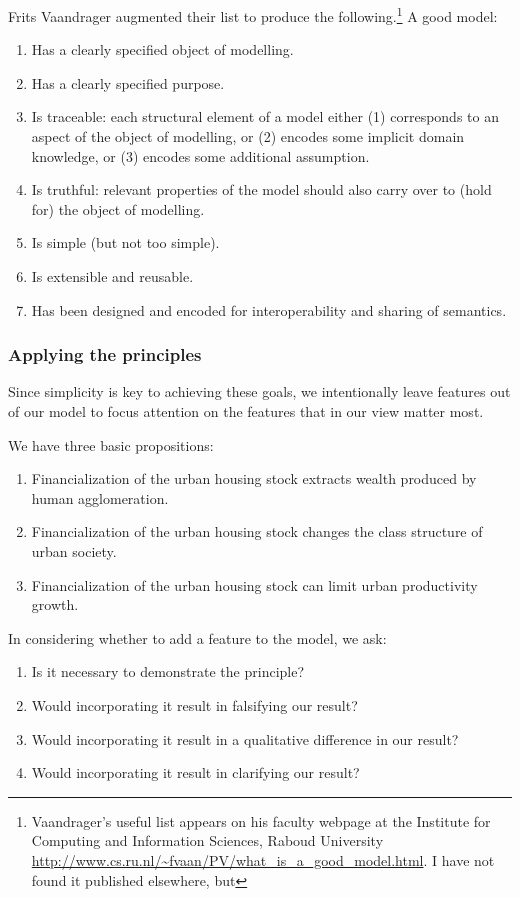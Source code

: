Frits Vaandrager %
augmented their list to produce the following.\footnote{Vaandrager's useful list appears on his faculty webpage at the Institute for Computing and Information Sciences, Raboud University \url{http://www.cs.ru.nl/~fvaan/PV/what_is_a_good_model.html}. I have not found it published elsewhere, but  } A good model: \begin{enumerate}
     \item Has a clearly specified object of modelling.
     \item Has a clearly specified purpose.
     \item Is traceable: each structural element of a model either (1) corresponds to an aspect of the object of modelling, or (2) encodes some implicit domain knowledge, or (3) encodes some additional assumption.
     \item Is truthful: relevant properties of the model should also carry over to (hold for) the object of modelling.
     \item Is simple (but not too simple).
     \item Is extensible and reusable.
     \item Has been designed and encoded for interoperability and sharing of semantics.
 \end{enumerate}

\subsubsection{Applying the principles}
Since simplicity is key to achieving these goals, %
we intentionally leave features out of our model to focus attention on the features that in our view matter most. 


We have three basic propositions:
\begin{enumerate}
    \item Financialization of the urban housing stock extracts wealth produced by human agglomeration. 
    \item Financialization of the urban housing stock changes the class structure of urban society. 
    \item Financialization of the urban housing stock can limit urban productivity growth. 
\end{enumerate}
In considering whether to add a feature to the model, we ask: %
\begin{enumerate}
    \item Is it necessary to demonstrate the principle? 
    \item Would incorporating it result in falsifying our result?
    \item Would incorporating it result in a qualitative difference in our result?
    \item Would incorporating it result in clarifying our result?
\end{enumerate}

